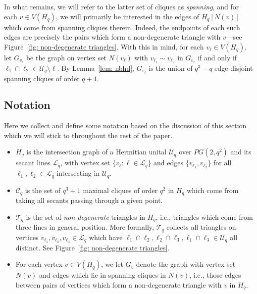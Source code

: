 \documentclass[A4paper,reqno,oneside,12pt]{amsart}
\theoremstyle{plain}
\theoremstyle{definition}
\newcommand{\scC}{\mathscr{C}}
\newcommand{\scL}{\mathscr{L}}
\newcommand{\scT}{\mathscr{T}}
\newcommand{\scU}{\mathscr{U}}
\def\l{\ell}
\begin{document}
In what remains, we will refer to the latter set of cliques as {\it spanning}, and for each $v \in V(H_q)$, we will primarily be interested in the edges of $H_q[N(v)]$ which come from spanning cliques therein.
Indeed, the endpoints of each such edges are precisely the pairs which form a non-degenerate triangle with $v$---see Figure~\ref{fig: non-degenerate triangles}.
With this in mind, for each $v_\l \in V(H_q)$, let $G_{v_\l}$ be the graph on vertex set $N(v_\l)$ with $v_{\l_1} \sim v_{\l_2}$ in $G_{v_\l}$ if and only if $\l_1 \cap \l_2 \in \scU_q \setminus \l$.
By Lemma~\ref{lem: nbhd}, $G_{v_\l}$ is the union of $q^3-q$ edge-disjoint spanning cliques of order $q+1$.

\subsection{Notation}
\label{subsection: notation}
Here we collect and define some notation based on the discussion of this section which we will stick to throughout the rest of the paper.
\begin{itemize}
    \item $H_q$ is the intersection graph of a Hermitian unital $\scU_q$ over $PG(2,q^2)$ and its secant lines $\scL_q$, with vertex set $\{v_\l: \l \in \scL_q\}$ and edges $\{v_{\l_1}, v_{\l_2}\}$ for all $\l_1, \l_2 \in \scL_q$ intersecting in $\scU_q$.
    \item $\scC_q$ is the set of $q^3+1$ maximal cliques of order $q^2$ in $H_q$ which come from taking all secants passing through a given point.
    \item $\scT_q$ is the set of {\it non-degenerate} triangles in $H_q$, i.e., triangles which come from three lines in general position. More formally, $\scT_q$ collects all triangles on vertices $v_{\l_1}, v_{\l_2}, v_{\l_3} \in \scL_q$ which have $\l_1 \cap \l_2, \l_2 \cap \l_3, \l_1 \cap \l_3 \in \scU_q$ all distinct.
    See Figure~\ref{fig: non-degenerate triangles}.
    \item For each vertex $v \in V(H_q)$, we let $G_v$ denote the graph with vertex set $N(v)$ and edges which lie in spanning cliques in $N(v)$, i.e., those edges between pairs of vertices which form a non-degenerate triangle with $v$ in $H_q$. 
\end{itemize}
\end{document}
